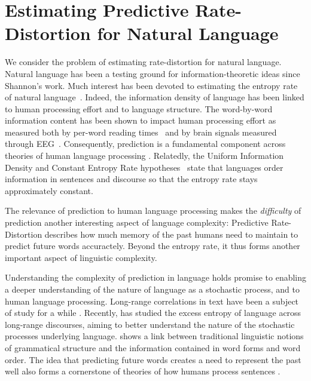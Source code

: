 \documentclass[entropy,article,submit,moreauthors,pdftex,10pt,a4paper]{Definitions/mdpi}
\begin{document}
\section{Estimating Predictive Rate-Distortion   for Natural Language}\label{sec:language}

We consider the problem of estimating rate-distortion for natural language.
Natural language has been a testing ground for information-theoretic ideas since Shannon's work.
Much interest has been devoted to estimating the entropy rate of natural language~\citep{shannon1951prediction,takahira2016entropy,bentz2017entropy,takahashi2018cross}.
Indeed, the information density of language has been linked to human processing effort and to language structure.
The word-by-word information content has been shown to impact human processing effort as measured both by per-word reading times~\citep{hale-probabilistic-2001,levy-expectation-based-2008,smith-effect-2013} and by brain signals measured through EEG~\citep{DBLP:conf/acl/FrankOGV13, kuperberg2016we}.
Consequently, prediction is a fundamental component across theories of human language processing  \citep{kuperberg2016we}.
Relatedly, the Uniform Information Density and Constant Entropy Rate hypotheses~\citep{fenk1980konstanz,genzel2002entropy,jaeger2007speakers} state that languages order information in sentences and discourse so that the entropy rate stays approximately constant. %

The relevance of prediction to human language processing makes the \emph{difficulty} of prediction another interesting aspect of language complexity:
Predictive Rate-Distortion describes how much memory of the past humans need to maintain to predict future words accuractely.
Beyond the entropy rate, it thus forms another important aspect of linguistic complexity.


Understanding the complexity of prediction in language holds promise to enabling a deeper understanding of the nature of language as a stochastic process, and to human language processing.
Long-range correlations in text have been a subject of study for a while \citep{schenkel1993long,ebeling1994entropy,ebeling1995long,altmann2012origin,yang2016long,chen2018quantifying}.
Recently, \citet{dkebowski2018natural} has studied the excess entropy of language across long-range discourses, aiming to better understand the nature of the stochastic processes underlying language.
\citet{koplenig2017statistical} shows a link between traditional linguistic notions of grammatical structure and the information contained in word forms and word order.
The idea that predicting future words creates a need to represent the past well also forms a cornerstone of theories of how humans process sentences \citep{gibson-linguistic-1998,futrell-noisy-context-2017}.
\end{document}

